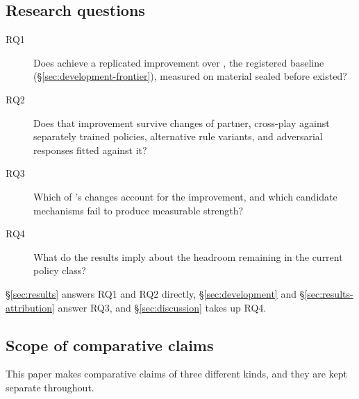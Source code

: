 \subsection{Research questions}
\label{sec:intro-rq}

\begin{description}
\item[RQ1] Does \sestina{} achieve a replicated improvement over \fcheap{}, the registered
  baseline (\S\ref{sec:development-frontier}), measured on material sealed before \sestina{}
  existed?
\item[RQ2] Does that improvement survive changes of partner, cross-play against separately trained
  policies, alternative rule variants, and adversarial responses fitted against it?
\item[RQ3] Which of \sestina{}'s changes account for the improvement, and which candidate
  mechanisms fail to produce measurable strength?
\item[RQ4] What do the results imply about the headroom remaining in the current policy class?
\end{description}

\S\ref{sec:results} answers RQ1 and RQ2 directly, \S\ref{sec:development} and
\S\ref{sec:results-attribution} answer RQ3, and \S\ref{sec:discussion} takes up RQ4.

\subsection{Scope of comparative claims}
\label{sec:intro-strength}

This paper makes comparative claims of three different kinds, and they are kept separate throughout.

